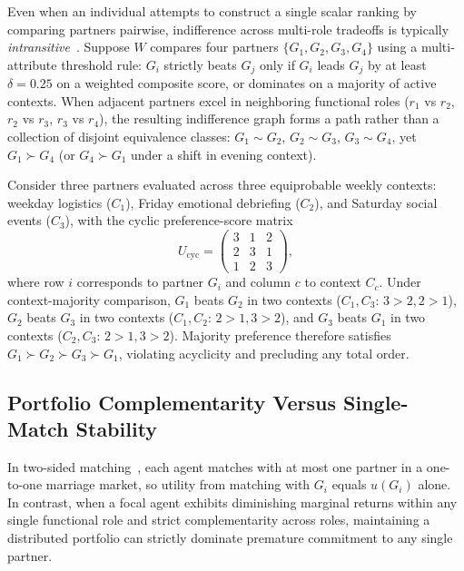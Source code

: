 Even when an individual attempts to construct a single scalar ranking by
comparing partners pairwise, indifference across multi-role tradeoffs is
typically \emph{intransitive}~\citep{fishburn1970utility,sen2017collective}.
Suppose $W$ compares four partners $\{G_1, G_2, G_3, G_4\}$ using a
multi-attribute threshold rule: $G_i$ strictly beats $G_j$ only if $G_i$ leads
$G_j$ by at least $\delta = 0.25$ on a weighted composite score, or dominates on
a majority of active contexts. When adjacent partners excel in neighboring
functional roles ($r_1$ vs $r_2$, $r_2$ vs $r_3$, $r_3$ vs $r_4$), the resulting
indifference graph forms a path rather than a collection of disjoint equivalence
classes: $G_1 \sim G_2$, $G_2 \sim G_3$, $G_3 \sim G_4$, yet $G_1 \succ G_4$
(or $G_4 \succ G_1$ under a shift in evening context).

\begin{example}
\label{ex:condorcet-cycle}
Consider three partners evaluated across three equiprobable weekly contexts:
weekday logistics ($C_1$), Friday emotional debriefing ($C_2$), and Saturday
social events ($C_3$), with the cyclic preference-score matrix
\begin{equation*}
  U_{\mathrm{cyc}} = \begin{pmatrix}
    3 & 1 & 2 \\
    2 & 3 & 1 \\
    1 & 2 & 3
  \end{pmatrix},
\end{equation*}
where row $i$ corresponds to partner $G_i$ and column $c$ to context $C_c$.
Under context-majority comparison, $G_1$ beats $G_2$ in two contexts
($C_1, C_3$: $3>2, 2>1$), $G_2$ beats $G_3$ in two contexts ($C_1, C_2$: $2>1, 3>2$),
and $G_3$ beats $G_1$ in two contexts ($C_2, C_3$: $2>1, 3>2$). Majority
preference therefore satisfies $G_1 \succ G_2 \succ G_3 \succ G_1$, violating
acyclicity and precluding any total order.
\end{example}

\subsection{Portfolio Complementarity Versus Single-Match Stability}
\label{subsec:bg-portfolio}

In two-sided matching~\citep{gale1962college,roth1990two}, each agent matches
with at most one partner in a one-to-one marriage market, so utility from
matching with $G_i$ equals $u(G_i)$ alone. In contrast, when a focal agent
exhibits diminishing marginal returns within any single functional role and
strict complementarity across roles, maintaining a distributed portfolio can
strictly dominate premature commitment to any single partner.

